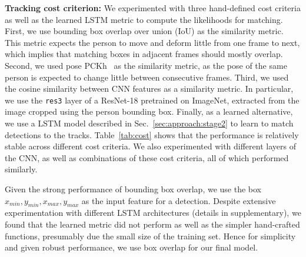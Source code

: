 \documentclass[10pt,twocolumn,letterpaper]{article}
\begin{document}
{\noindent \bf Tracking cost criterion:}\label{sec:exp:cost}
We experimented with three hand-defined cost criteria as well as the learned LSTM metric to
compute the likelihoods for matching.
First, we use bounding box overlap over union (IoU) as the similarity metric.
This metric expects the person to move and deform little from one frame to next, which implies that matching boxes in adjacent frames should mostly overlap. Second, we used pose PCKh~\cite{yang2013articulated} as
the similarity metric, as the pose of the same person is expected to change little between
consecutive frames. 
Third, we used the cosine similarity between CNN features as a similarity metric. In particular, we use the \texttt{res3} layer of a ResNet-18 pretrained on ImageNet, extracted from the
image cropped using the person bounding box. 
Finally, as a learned alternative, we use a LSTM model described in Sec.~\ref{sec:approach:stage2} to learn to match detections to the tracks. Table~\ref{tab:cost} shows that the performance is relatively stable across different
cost criteria. We also experimented with different layers of the CNN, as well as combinations of these cost criteria, all of which performed similarly. 

Given the strong performance of bounding box overlap,
we use the box $x_{min},y_{min},x_{max},y_{max}$ as the input feature for a detection.
Despite extensive experimentation with different LSTM architectures (details in supplementary), we found that the learned metric did not perform as well as the simpler hand-crafted functions,
presumably due the small size of the training set. 
Hence for simplicity and given robust performance, we
use box overlap for our final model.
\end{document}

